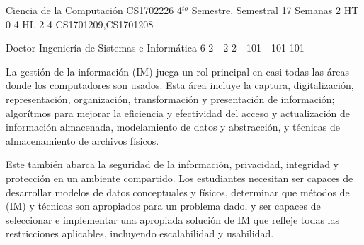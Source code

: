 \documentclass[a4paper,8pt]{article}
\begin{document}
\setNombreProfesor{}
\setGradoProfesorAbreviado{}
\sylabusHeader

\academicaTable
{Ciencia de la Computación} %
{CS1702226} %
{4$^{to}$ Semestre.} %
{Semestral} %
{17 Semanas} %
{2 HT} %
{} %
{0} %
{4 HL}  %
{2} %
{4} %
{CS1701209,CS1701208} %

\administrativaTable
{Doctor} %
{Ingeniería de Sistemas e Informática} %
{6} %
{2} %
{-} %
{2} %
{2} %
{-} %
{101} %
{-} %
{101} %
{101} %
{-} %


\begin{fundamentacion}
La gestión de la información (IM) juega un rol principal en casi todas las áreas donde los computadores son usados. 
Esta área incluye la captura, digitalización, representación, organización, transformación y presentación de información; 
algorítmos para mejorar la eficiencia y efectividad del acceso y actualización de información almacenada, 
modelamiento de datos y abstracción, y técnicas de almacenamiento de archivos físicos.

Este también abarca la seguridad de la información, privacidad, integridad y protección en un ambiente compartido. 
Los estudiantes necesitan ser capaces de desarrollar modelos de datos conceptuales y físicos, determinar que métodos de (IM) y 
técnicas son apropiados para un problema dado, y ser capaces de seleccionar e implementar una apropiada solución de IM 
que refleje todas las restricciones aplicables, incluyendo escalabilidad y usabilidad.

\end{fundamentacion}

\begin{sumilla}
\item \IMDatabaseSystems
\item \IMDataModeling
\item \IMIndexing
\item \IMRelationalDatabases
\item \IMQueryLanguages

\end{sumilla}
\end{document}
